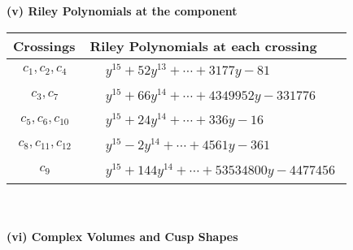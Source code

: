 \documentclass[1p]{elsarticle_modified}
\theoremstyle{definition}
\begin{document}
\newpage\renewcommand{\arraystretch}{1}
\flushleft \textbf{(v) Riley Polynomials at the component}\newline \\
\begin{tabular}{m{50pt}|m{274pt}}
Crossings & \hspace{64pt}Riley Polynomials at each crossing \\
\hline $$\begin{aligned}c_{1},c_{2},c_{4}\end{aligned}$$&$\begin{aligned}
&y^{15}+52 y^{13}+\cdots+3177 y-81
\end{aligned}$\\
\hline $$\begin{aligned}c_{3},c_{7}\end{aligned}$$&$\begin{aligned}
&y^{15}+66 y^{14}+\cdots+4349952 y-331776
\end{aligned}$\\
\hline $$\begin{aligned}c_{5},c_{6},c_{10}\end{aligned}$$&$\begin{aligned}
&y^{15}+24 y^{14}+\cdots+336 y-16
\end{aligned}$\\
\hline $$\begin{aligned}c_{8},c_{11},c_{12}\end{aligned}$$&$\begin{aligned}
&y^{15}-2 y^{14}+\cdots+4561 y-361
\end{aligned}$\\
\hline $$\begin{aligned}c_{9}\end{aligned}$$&$\begin{aligned}
&y^{15}+144 y^{14}+\cdots+53534800 y-4477456
\end{aligned}$\\
\hline
\end{tabular}\\~\\
\newpage\flushleft \textbf{(vi) Complex Volumes and Cusp Shapes}
\end{document}
